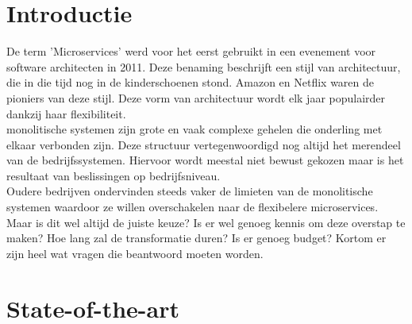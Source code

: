 
\section{Introductie} %
\label{sec:introductie}




De term 'Microservices' werd voor het eerst gebruikt in een evenement voor software architecten in 2011.
Deze benaming beschrijft een stijl van architectuur, die in die tijd nog in de kinderschoenen stond. Amazon en Netflix waren de pioniers van deze stijl. Deze vorm van architectuur wordt elk jaar populairder dankzij haar flexibiliteit.\\
monolitische systemen zijn grote en vaak complexe gehelen die onderling met elkaar verbonden zijn. Deze structuur vertegenwoordigd nog altijd het merendeel van de bedrijfssystemen. Hiervoor wordt meestal niet bewust gekozen maar is het resultaat van beslissingen op bedrijfsniveau.\\
Oudere bedrijven ondervinden steeds vaker de limieten van de monolitische systemen waardoor ze willen overschakelen naar de flexibelere microservices. Maar is dit wel altijd de juiste keuze? Is er wel genoeg kennis om deze overstap te maken? Hoe lang zal de transformatie duren? Is er genoeg budget? Kortom er zijn heel wat vragen die beantwoord moeten worden.
  

 


\section{State-of-the-art}
\label{sec:state-of-the-art}


